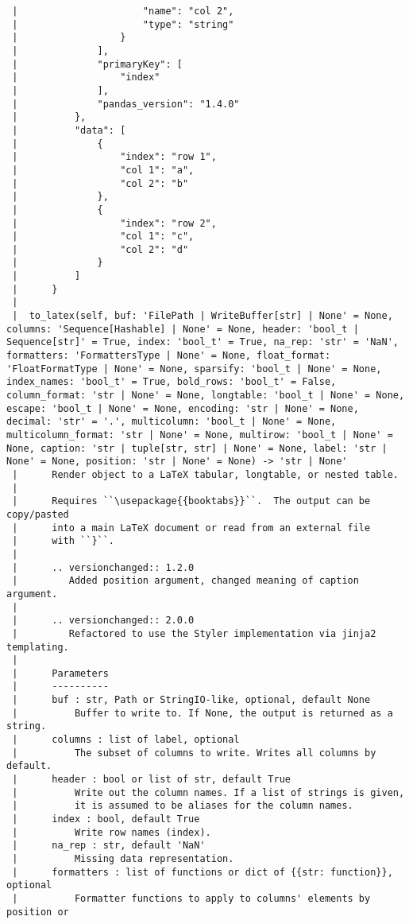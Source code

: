 \documentclass[
  letterpaper,
  DIV=11,
  numbers=noendperiod]{scrreprt}
\begin{document}
\begin{verbatim}
 |                      "name": "col 2",
 |                      "type": "string"
 |                  }
 |              ],
 |              "primaryKey": [
 |                  "index"
 |              ],
 |              "pandas_version": "1.4.0"
 |          },
 |          "data": [
 |              {
 |                  "index": "row 1",
 |                  "col 1": "a",
 |                  "col 2": "b"
 |              },
 |              {
 |                  "index": "row 2",
 |                  "col 1": "c",
 |                  "col 2": "d"
 |              }
 |          ]
 |      }
 |  
 |  to_latex(self, buf: 'FilePath | WriteBuffer[str] | None' = None, columns: 'Sequence[Hashable] | None' = None, header: 'bool_t | Sequence[str]' = True, index: 'bool_t' = True, na_rep: 'str' = 'NaN', formatters: 'FormattersType | None' = None, float_format: 'FloatFormatType | None' = None, sparsify: 'bool_t | None' = None, index_names: 'bool_t' = True, bold_rows: 'bool_t' = False, column_format: 'str | None' = None, longtable: 'bool_t | None' = None, escape: 'bool_t | None' = None, encoding: 'str | None' = None, decimal: 'str' = '.', multicolumn: 'bool_t | None' = None, multicolumn_format: 'str | None' = None, multirow: 'bool_t | None' = None, caption: 'str | tuple[str, str] | None' = None, label: 'str | None' = None, position: 'str | None' = None) -> 'str | None'
 |      Render object to a LaTeX tabular, longtable, or nested table.
 |      
 |      Requires ``\usepackage{{booktabs}}``.  The output can be copy/pasted
 |      into a main LaTeX document or read from an external file
 |      with ``}``.
 |      
 |      .. versionchanged:: 1.2.0
 |         Added position argument, changed meaning of caption argument.
 |      
 |      .. versionchanged:: 2.0.0
 |         Refactored to use the Styler implementation via jinja2 templating.
 |      
 |      Parameters
 |      ----------
 |      buf : str, Path or StringIO-like, optional, default None
 |          Buffer to write to. If None, the output is returned as a string.
 |      columns : list of label, optional
 |          The subset of columns to write. Writes all columns by default.
 |      header : bool or list of str, default True
 |          Write out the column names. If a list of strings is given,
 |          it is assumed to be aliases for the column names.
 |      index : bool, default True
 |          Write row names (index).
 |      na_rep : str, default 'NaN'
 |          Missing data representation.
 |      formatters : list of functions or dict of {{str: function}}, optional
 |          Formatter functions to apply to columns' elements by position or

\end{verbatim}
\end{document}
